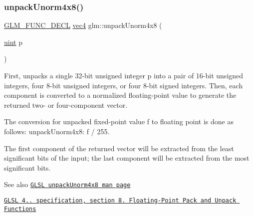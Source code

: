 \subsubsection{\texorpdfstring{unpack\+Unorm4x8()}{unpackUnorm4x8()}}
{\footnotesize\ttfamily \hyperlink{setup_8hpp_ab2d052de21a70539923e9bcbf6e83a51}{G\+L\+M\+\_\+\+F\+U\+N\+C\+\_\+\+D\+E\+CL} \hyperlink{group__core__types_ga5881b1b022d7fd1b7218f5916532dd02}{vec4} glm\+::unpack\+Unorm4x8 (\begin{DoxyParamCaption}\item[{\hyperlink{group__core__precision_ga4fd29415871152bfb5abd588334147c8}{uint}}]{p }\end{DoxyParamCaption})}

First, unpacks a single 32-\/bit unsigned integer p into a pair of 16-\/bit unsigned integers, four 8-\/bit unsigned integers, or four 8-\/bit signed integers. Then, each component is converted to a normalized floating-\/point value to generate the returned two-\/ or four-\/component vector.

The conversion for unpacked fixed-\/point value f to floating point is done as follows\+: unpack\+Unorm4x8\+: f / 255.

The first component of the returned vector will be extracted from the least significant bits of the input; the last component will be extracted from the most significant bits.

\begin{DoxySeeAlso}{See also}
\href{http://www.opengl.org/sdk/docs/manglsl/xhtml/unpackUnorm4x8.xml}{\tt G\+L\+SL unpack\+Unorm4x8 man page} 

\href{http://www.opengl.org/registry/doc/GLSLangSpec.4.20.8.pdf}{\tt G\+L\+SL 4.. specification, section 8. Floating-\/\+Point Pack and Unpack Functions} 
\end{DoxySeeAlso}
